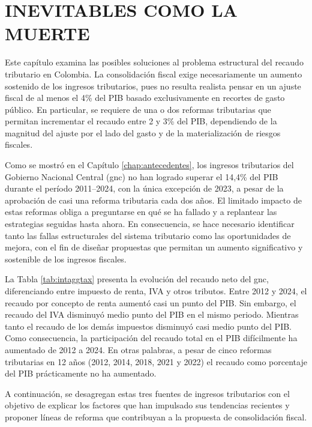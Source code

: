 \chapter{INEVITABLES COMO LA MUERTE}\label{chap:masingresos}

Este capítulo examina las posibles soluciones al problema estructural del recaudo tributario en Colombia. La consolidación fiscal exige necesariamente un aumento sostenido de los ingresos tributarios, pues no resulta realista pensar en un ajuste fiscal de al menos el 4\% del PIB basado exclusivamente en recortes de gasto público. En particular, se requiere de una o dos reformas tributarias  que permitan incrementar el recaudo entre 2 y 3\% del PIB, dependiendo de la magnitud del ajuste por el lado del gasto y de la materialización de riesgos fiscales. 

Como se mostró en el Capítulo \ref{chap:antecedentes}, los ingresos tributarios del Gobierno Nacional Central (\gls{gnc}) no han logrado superar el 14,4\% del PIB durante el período 2011–2024, con la única excepción de 2023, a pesar de la aprobación de casi una reforma tributaria cada dos años. El limitado impacto de estas reformas obliga a preguntarse en qué se ha fallado y a replantear las estrategias seguidas hasta ahora. En consecuencia, se hace necesario identificar tanto las fallas estructurales del sistema tributario como las oportunidades de mejora, con el fin de diseñar propuestas que permitan un aumento significativo y sostenible de los ingresos fiscales.



La Tabla \ref{tab:intaggtax} presenta la evolución del recaudo neto del \gls{gnc}, diferenciando entre impuesto de renta, IVA y otros tributos. Entre 2012 y 2024, el recaudo por concepto de renta aumentó casi un punto del PIB. Sin embargo, el recaudo del IVA disminuyó medio punto del PIB en el mismo periodo. Mientras tanto el recaudo de los demás impuestos disminuyó casi medio punto del PIB. Como consecuencia, la participación del recaudo total en el PIB difícilmente ha aumentado de 2012 a 2024. En otras palabras, a pesar de cinco reformas tributarias en 12 años (2012, 2014, 2018, 2021 y 2022) el recaudo como porcentaje del PIB prácticamente no ha aumentado.

A continuación, se desagregan estas tres fuentes de ingresos tributarios con el objetivo de explicar los factores que han impulsado sus tendencias recientes y proponer líneas de reforma que contribuyan a la propuesta de consolidación fiscal.

